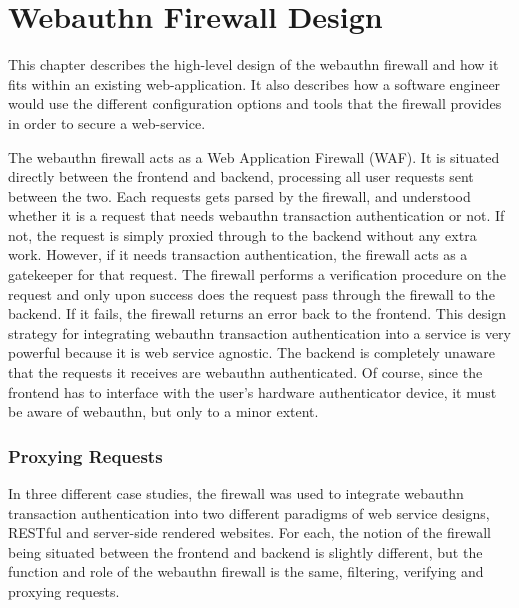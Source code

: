 \chapter{Webauthn Firewall Design}\label{Chap:WebauthnFirewallDesign}

This chapter describes the high-level design of the webauthn firewall and how it fits within an existing web-application. It also describes how a software engineer would use the different configuration options and tools that the firewall provides in order to secure a web-service.

The webauthn firewall acts as a Web Application Firewall (WAF). It is situated directly between the frontend and backend, processing all user requests sent between the two. Each requests gets parsed by the firewall, and understood whether it is a request that needs webauthn transaction authentication or not. If not, the request is simply proxied through to the backend without any extra work. However, if it needs transaction authentication, the firewall acts as a gatekeeper for that request. The firewall performs a verification procedure on the request and only upon success does the request pass through the firewall to the backend. If it fails, the firewall returns an error back to the frontend. This design strategy for integrating webauthn transaction authentication into a service is very powerful because it is web service agnostic. The backend is completely unaware that the requests it receives are webauthn authenticated. Of course, since the frontend has to interface with the user's hardware authenticator device, it must be aware of webauthn, but only to a minor extent. 

\subsection{Proxying Requests}

In three different case studies, the firewall was used to integrate webauthn transaction authentication into two different paradigms of web service designs, RESTful and server-side rendered websites. For each, the notion of the firewall being situated between the frontend and backend is slightly different, but the function and role of the webauthn firewall is the same, filtering, verifying and proxying requests. 

